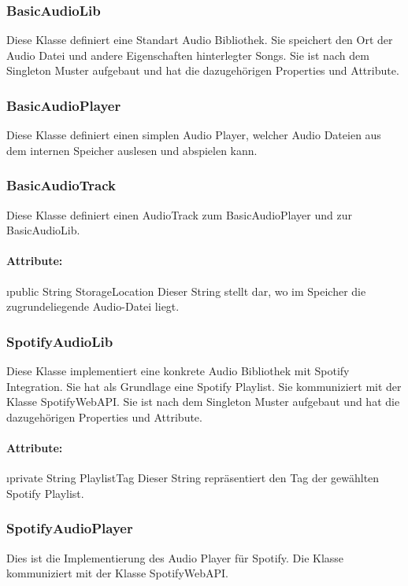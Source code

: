 \documentclass[../entwurf.tex]{subfiles}
\begin{document}
			\subsubsection{BasicAudioLib}
				Diese Klasse definiert eine Standart Audio Bibliothek. Sie speichert den Ort der Audio Datei und andere Eigenschaften hinterlegter
				Songs. Sie ist nach dem Singleton Muster aufgebaut und hat die dazugehörigen Properties und Attribute.
			\subsubsection{BasicAudioPlayer}
				Diese Klasse definiert einen simplen Audio Player, welcher Audio Dateien aus dem internen Speicher auslesen und abspielen kann.
			\subsubsection{BasicAudioTrack}
				Diese Klasse definiert einen AudioTrack zum BasicAudioPlayer und zur BasicAudioLib.
				\paragraph{Attribute:}
					\begin{itemize}
						\i{public String StorageLocation} Dieser String stellt dar, wo im Speicher die zugrundeliegende Audio-Datei liegt.
					\end{itemize}
			\subsubsection{SpotifyAudioLib}
				Diese Klasse implementiert eine konkrete Audio Bibliothek mit Spotify Integration.
				Sie hat als Grundlage eine Spotify Playlist. Sie kommuniziert mit der Klasse SpotifyWebAPI.
				Sie ist nach dem Singleton Muster aufgebaut und hat die dazugehörigen Properties und Attribute.
				\paragraph{Attribute:}
					\begin{itemize}
						\i{private String PlaylistTag} Dieser String repräsentiert den Tag der gewählten Spotify Playlist.
					\end{itemize}
			\subsubsection{SpotifyAudioPlayer}
				Dies ist die Implementierung des Audio Player für Spotify. Die Klasse kommuniziert mit der Klasse SpotifyWebAPI.
\end{document}

